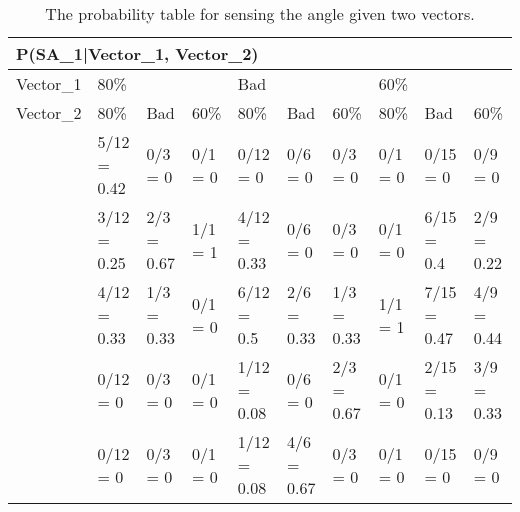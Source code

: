 \begin{table}[H]
\centering
\begin{tabular}{|l|p{1.2cm}|p{1.2cm}|p{1.2cm}|p{1.2cm}|p{1.2cm}|p{1.2cm}|p{1.2cm}|p{1.2cm}|p{1.2cm}|}
\hline
\multicolumn{10}{|l|}{P(SA\_1|Vector\_1, Vector\_2)} \\\hline 
Vector\_1 & \multicolumn{3}{l|}{80\%} & \multicolumn{3}{l|}{Bad} &
\multicolumn{3}{l|}{60\%}\\\hline 
Vector\_2 & 80\% & Bad & 60\% & 80\% & Bad & 60\% & 80\% & Bad & 60\% \\
\hline
[-30 - 0] & 5/12 = 0.42  & 0/3 = 0 & 0/1 = 0 & 0/12 = 0 & 0/6 = 0 & 0/3 = 0 &
0/1 = 0 & 0/15 = 0 & 0/9 = 0 \\ \hline
[0 - 30] & 3/12 = 0.25 & 2/3 = 0.67 & 1/1 = 1 & 4/12 = 0.33 & 0/6 = 0 & 0/3 = 0
& 0/1 = 0 & 6/15 = 0.4 & 2/9 = 0.22 \\ \hline
[30 - 60] & 4/12 = 0.33 & 1/3 = 0.33 & 0/1 = 0 & 6/12 = 0.5 & 2/6 = 0.33 & 1/3 =
0.33 & 1/1 = 1 & 7/15 = 0.47 & 4/9 = 0.44 \\ \hline
[60 - 90] & 0/12 = 0 & 0/3 = 0 & 0/1 = 0 & 1/12 = 0.08 & 0/6 = 0 & 2/3 = 0.67 &
0/1 = 0 & 2/15 = 0.13 & 3/9 = 0.33 \\ \hline
[90 - 330] & 0/12 = 0 & 0/3 = 0 & 0/1 = 0 & 1/12 = 0.08 & 4/6 = 0.67 & 0/3 = 0 &
0/1 = 0 & 0/15 = 0 & 0/9 = 0 \\ \hline
\end{tabular}
\caption{The probability table for sensing the angle given two vectors.}
\label{SDtable2}
\end{table}


